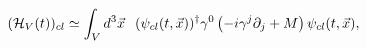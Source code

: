 \begin{equation}
\label{classicalenergy}
({\cal H}_V(t))_{cl} \simeq \int_V d^3{\vec x} \hspace{0.1in} 
(\psi_{cl}(t,{\vec x}))^{\dagger}\gamma^0\left(-i \gamma^{j} \partial_{j} 
+ M \right)\psi_{cl}(t,{\vec x}), 
\end{equation}

